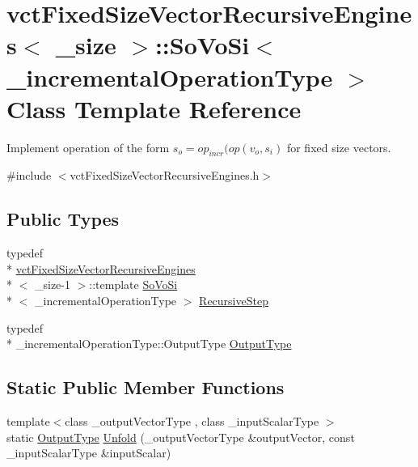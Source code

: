 \hypertarget{classvct_fixed_size_vector_recursive_engines_1_1_so_vo_si}{\section{vct\-Fixed\-Size\-Vector\-Recursive\-Engines$<$ \-\_\-size $>$\-:\-:So\-Vo\-Si$<$ \-\_\-incremental\-Operation\-Type $>$ Class Template Reference}
\label{classvct_fixed_size_vector_recursive_engines_1_1_so_vo_si}
}


Implement operation of the form $s_o = op_{incr}(op(v_o, s_i)$ for fixed size vectors.  




{\ttfamily \#include $<$vct\-Fixed\-Size\-Vector\-Recursive\-Engines.\-h$>$}

\subsection*{Public Types}
\begin{DoxyCompactItemize}
\item 
typedef \\*
\hyperlink{classvct_fixed_size_vector_recursive_engines}{vct\-Fixed\-Size\-Vector\-Recursive\-Engines}\\*
$<$ \-\_\-size-\/1 $>$\-::template \hyperlink{classvct_fixed_size_vector_recursive_engines_1_1_so_vo_si}{So\-Vo\-Si}\\*
$<$ \-\_\-incremental\-Operation\-Type $>$ \hyperlink{classvct_fixed_size_vector_recursive_engines_1_1_so_vo_si_ab2cd530a2ba5ab1e525322aa03a14620}{Recursive\-Step}
\item 
typedef \\*
\-\_\-incremental\-Operation\-Type\-::\-Output\-Type \hyperlink{classvct_fixed_size_vector_recursive_engines_1_1_so_vo_si_abbe36310e19f37465a117598a680abe5}{Output\-Type}
\end{DoxyCompactItemize}
\subsection*{Static Public Member Functions}
\begin{DoxyCompactItemize}
\item 
{\footnotesize template$<$class \-\_\-output\-Vector\-Type , class \-\_\-input\-Scalar\-Type $>$ }\\static \hyperlink{classvct_fixed_size_vector_recursive_engines_1_1_so_vo_si_abbe36310e19f37465a117598a680abe5}{Output\-Type} \hyperlink{classvct_fixed_size_vector_recursive_engines_1_1_so_vo_si_a053a9f378611c29bc9b339addcae401f}{Unfold} (\-\_\-output\-Vector\-Type \&output\-Vector, const \-\_\-input\-Scalar\-Type \&input\-Scalar)
\end{DoxyCompactItemize}


